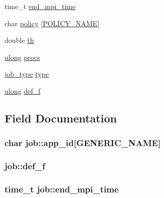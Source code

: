 \begin{DoxyCompactItemize}
time\+\_\+t \hyperlink{structjob_a82c674f24273e8a4e79f04c0b5972ba1}{end\+\_\+mpi\+\_\+time}
\item 
char \hyperlink{structjob_a827d48e89d46aa77e089f11b64c6a7b1}{policy} \mbox{[}\hyperlink{generic_8h_aa632ec4fb94abf052fbb91f4cd81a610}{P\+O\+L\+I\+C\+Y\+\_\+\+N\+A\+ME}\mbox{]}
\item 
double \hyperlink{structjob_a3234acc2eb607e1a7cb69da68c81ea00}{th}
\item 
\hyperlink{generic_8h_a718b4eb2652c286f4d42dc18a8e71a1a}{ulong} \hyperlink{structjob_aacbd58284400b92738096e855aad60cc}{procs}
\item 
\hyperlink{generic_8h_ab32c62ca0e3ec31dee6abc5647ef6649}{job\+\_\+type} \hyperlink{structjob_afec31cc8c3c88d4c554a7bcb6307da8c}{type}
\item 
\hyperlink{generic_8h_a718b4eb2652c286f4d42dc18a8e71a1a}{ulong} \hyperlink{structjob_adecf5ae4909df0587be6eb9762aeab3d}{def\+\_\+f}
\end{DoxyCompactItemize}


\subsection{Field Documentation}
\subsubsection[{\texorpdfstring{app\+\_\+id}{app_id}}]{\setlength{\rightskip}{0pt plus 5cm}char job\+::app\+\_\+id\mbox{[}{\bf G\+E\+N\+E\+R\+I\+C\+\_\+\+N\+A\+ME}\mbox{]}}\hypertarget{structjob_ac8ae0afb961355375b16051aa4f2ca22}{}\label{structjob_ac8ae0afb961355375b16051aa4f2ca22}
\subsubsection[{\texorpdfstring{def\+\_\+f}{def_f}}]{ job\+::def\+\_\+f}\hypertarget{structjob_adecf5ae4909df0587be6eb9762aeab3d}{}\label{structjob_adecf5ae4909df0587be6eb9762aeab3d}
\subsubsection[{\texorpdfstring{end\+\_\+mpi\+\_\+time}{end_mpi_time}}]{\setlength{\rightskip}{0pt plus 5cm}time\+\_\+t job\+::end\+\_\+mpi\+\_\+time}\hypertarget{structjob_a82c674f24273e8a4e79f04c0b5972ba1}{}\label{structjob_a82c674f24273e8a4e79f04c0b5972ba1}
